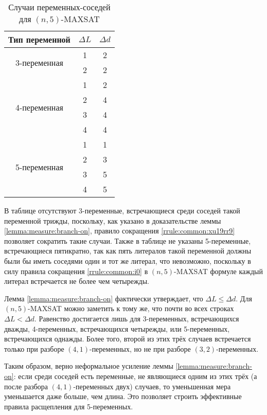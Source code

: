 \begin{table}[ht]
 \centering
 \caption{Случаи переменных-соседей для $(n,5)$-MAXSAT}
 \begin{tabular}{|c|c|c|}
  \hline
  Тип переменной & $\Delta L$ & $\Delta d$ \\
  \hline\hline
  \multirow{2}{*}{3-переменная}
                 & 1          & 2 \\
                 & 2          & 2 \\
  \hline
  \multirow{4}{*}{4-переменная}
                 & 1          & 2 \\
                 & 2          & 4 \\
                 & 3          & 4 \\
                 & 4          & 4 \\
  \hline
  \multirow{4}{*}{5-переменная}
                 & 1          & 1 \\
                 & 2          & 3 \\
                 & 3          & 5 \\
                 & 4          & 5 \\
  \hline
 \end{tabular}
 \label{table:n5:varcases}
\end{table}

В таблице отсутствуют 3-переменные, встречающиеся среди соседей такой переменной трижды, поскольку, как указано в доказательстве леммы \ref{lemma:measure:branch-on}, правило сокращения \ref{rrule:common:xu19rr9} позволяет сократить такие случаи. Также в таблице не указаны 5-переменные, встречающиеся пятикратно, так как пять литералов такой переменной должны были бы иметь соседями один и тот же литерал, что невозможно, поскольку в силу правила сокращения \ref{rrule:common:i0} в $(n,5)$-MAXSAT формуле каждый литерал встречается не более чем четырежды.

Лемма \ref{lemma:measure:branch-on} фактически утверждает, что $\Delta L \leq \Delta d$. Для $(n,5)$-MAXSAT можно заметить к тому же, что почти во всех строках $\Delta L < \Delta d$. Равенство достигается лишь для 3-переменных, встречающихся дважды, 4-переменных, встречающихся четырежды, или 5-переменных, встречающихся однажды. Более того, второй из этих трёх случаев встречается только при разборе $(4,1)$-переменных, но не при разборе $(3,2)$-переменных.

Таким образом, верно неформальное усиление леммы \ref{lemma:measure:branch-on}: если среди соседей есть переменные, не являющиеся одним из этих трёх (а после разбора $(4,1)$-переменных двух) случаев, то уменьшенная мера уменьшается даже больше, чем длина. Это позволяет строить эффективные правила расщепления для 5-переменных.

